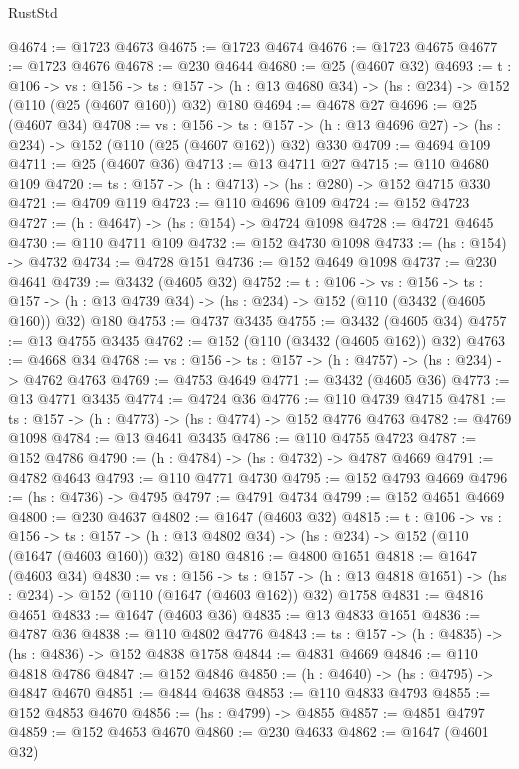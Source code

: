 \begin{lexlean}{RustStd}
\begin{coremodule}
@4674 := @1723 @4673
@4675 := @1723 @4674
@4676 := @1723 @4675
@4677 := @1723 @4676
@4678 := @230 @4644
@4680 := @25 (@4607 @32)
@4693 := {t : @106} ->
  {vs : @156} ->
  {ts : @157} -> (h : @13 @4680 @34) -> (hs : @234) -> @152 (@110 (@25 (@4607 @160)) @32) @180
@4694 := @4678 @27
@4696 := @25 (@4607 @34)
@4708 := {vs : @156} ->
  {ts : @157} -> (h : @13 @4696 @27) -> (hs : @234) -> @152 (@110 (@25 (@4607 @162)) @32) @330
@4709 := @4694 @109
@4711 := @25 (@4607 @36)
@4713 := @13 @4711 @27
@4715 := @110 @4680 @109
@4720 := {ts : @157} -> (h : @4713) -> (hs : @280) -> @152 @4715 @330
@4721 := @4709 @119
@4723 := @110 @4696 @109
@4724 := @152 @4723
@4727 := (h : @4647) -> (hs : @154) -> @4724 @1098
@4728 := @4721 @4645
@4730 := @110 @4711 @109
@4732 := @152 @4730 @1098
@4733 := (hs : @154) -> @4732
@4734 := @4728 @151
@4736 := @152 @4649 @1098
@4737 := @230 @4641
@4739 := @3432 (@4605 @32)
@4752 := {t : @106} ->
  {vs : @156} ->
  {ts : @157} -> (h : @13 @4739 @34) -> (hs : @234) -> @152 (@110 (@3432 (@4605 @160)) @32) @180
@4753 := @4737 @3435
@4755 := @3432 (@4605 @34)
@4757 := @13 @4755 @3435
@4762 := @152 (@110 (@3432 (@4605 @162)) @32)
@4763 := @4668 @34
@4768 := {vs : @156} -> {ts : @157} -> (h : @4757) -> (hs : @234) -> @4762 @4763
@4769 := @4753 @4649
@4771 := @3432 (@4605 @36)
@4773 := @13 @4771 @3435
@4774 := @4724 @36
@4776 := @110 @4739 @4715
@4781 := {ts : @157} -> (h : @4773) -> (hs : @4774) -> @152 @4776 @4763
@4782 := @4769 @1098
@4784 := @13 @4641 @3435
@4786 := @110 @4755 @4723
@4787 := @152 @4786
@4790 := (h : @4784) -> (hs : @4732) -> @4787 @4669
@4791 := @4782 @4643
@4793 := @110 @4771 @4730
@4795 := @152 @4793 @4669
@4796 := (hs : @4736) -> @4795
@4797 := @4791 @4734
@4799 := @152 @4651 @4669
@4800 := @230 @4637
@4802 := @1647 (@4603 @32)
@4815 := {t : @106} ->
  {vs : @156} ->
  {ts : @157} -> (h : @13 @4802 @34) -> (hs : @234) -> @152 (@110 (@1647 (@4603 @160)) @32) @180
@4816 := @4800 @1651
@4818 := @1647 (@4603 @34)
@4830 := {vs : @156} ->
  {ts : @157} -> (h : @13 @4818 @1651) -> (hs : @234) -> @152 (@110 (@1647 (@4603 @162)) @32) @1758
@4831 := @4816 @4651
@4833 := @1647 (@4603 @36)
@4835 := @13 @4833 @1651
@4836 := @4787 @36
@4838 := @110 @4802 @4776
@4843 := {ts : @157} -> (h : @4835) -> (hs : @4836) -> @152 @4838 @1758
@4844 := @4831 @4669
@4846 := @110 @4818 @4786
@4847 := @152 @4846
@4850 := (h : @4640) -> (hs : @4795) -> @4847 @4670
@4851 := @4844 @4638
@4853 := @110 @4833 @4793
@4855 := @152 @4853 @4670
@4856 := (hs : @4799) -> @4855
@4857 := @4851 @4797
@4859 := @152 @4653 @4670
@4860 := @230 @4633
@4862 := @1647 (@4601 @32)

\end{coremodule}
\end{lexlean}
